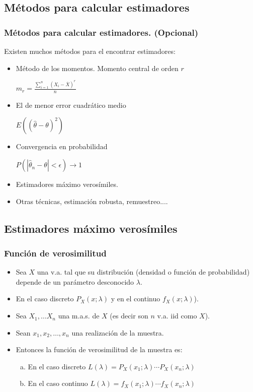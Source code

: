 \subsection{Métodos para calcular estimadores}

\begin{frame}
\frametitle{Métodos para calcular estimadores. (\textbf{Opcional})}

Existen muchos métodos para el encontrar  estimadores:

\begin{itemize}
\item Método de los momentos. Momento central de orden $r$

$m_{r}=\frac{\sum_{i=1}^{n} (X_{i}-\overline{X})^r}{n}$

\item El de menor error cuadrático medio

$E((\hat{\theta}-\theta)^2)$

\item  Convergencia en probabilidad

$P(|\hat{\theta}_{n}-\theta|<\epsilon)\to 1$

\item Estimadores máximo verosímiles.
\item Otras técnicas, estimación robusta, remuestreo....
\end{itemize}

\end{frame}

\subsection{Estimadores máximo verosímiles}
\begin{frame}
\frametitle{ Función de verosimilitud}
\begin{itemize}
\item Sea $X$ una v.a. tal que su distribución (densidad o función de probabilidad) depende de un
parámetro desconocido $\lambda$.
\item En el caso discreto $P_X(x;\lambda)$ y en el continuo
$f_X(x;\lambda)$).
\item  Sea $X_{1},\ldots X_{n}$ una m.a.s. de $X$ (es decir son $n$ v.a. iid
como $X$).
\item Sean $x_1,x_2,\ldots,x_n$ una realización de la muestra.
\item  Entonces la función de verosimilitud de la muestra es:

\begin{enumerate}[a)]
\item En el caso discreto $L(\lambda)=P_X(x_1;\lambda)\cdots P_X(x_n;\lambda)$
\item En el caso continuo $L(\lambda)=f_X(x_1;\lambda)\cdots f_X(x_n;\lambda)$
\end{enumerate}
\end{itemize}
\end{frame}

